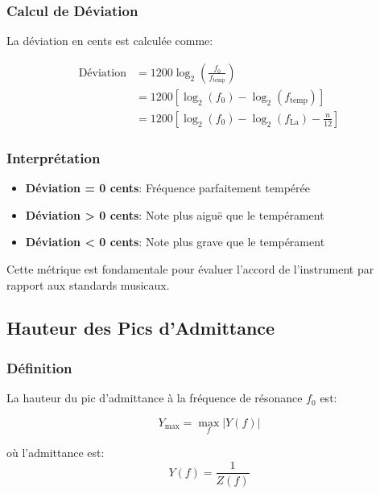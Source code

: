 \documentclass[12pt,a4paper,twocolumn]{article}
\newcommand{\impedance}{Z}
\newcommand{\admittance}{Y}
\newcommand{\freq}{f}
\newcommand{\freqzero}{f_0}
\begin{document}
\subsubsection{Calcul de Déviation}

La déviation en cents est calculée comme:

\begin{align}
\text{Déviation} &= 1200 \log_2\left(\frac{\freqzero}{\freq_{\text{temp}}}\right) \\
&= 1200 \left[\log_2(\freqzero) - \log_2(\freq_{\text{temp}})\right] \\
&= 1200 \left[\log_2(\freqzero) - \log_2(\freq_{\text{La}}) - \frac{n}{12}\right]
\label{eq:deviation_deriv}
\end{align}

\subsubsection{Interprétation}

\begin{itemize}
    \item \textbf{Déviation = 0 cents}: Fréquence parfaitement tempérée
    \item \textbf{Déviation > 0 cents}: Note plus aiguë que le tempérament
    \item \textbf{Déviation < 0 cents}: Note plus grave que le tempérament
\end{itemize}

Cette métrique est fondamentale pour évaluer l'accord de l'instrument par rapport aux standards musicaux.

\subsection{Hauteur des Pics d'Admittance}

\subsubsection{Définition}

La hauteur du pic d'admittance à la fréquence de résonance $\freqzero$ est:

\begin{equation}
\admittance_{\max} = \max_f |\admittance(f)|
\label{eq:admittance_peak}
\end{equation}

où l'admittance est:
\begin{equation}
\admittance(f) = \frac{1}{\impedance(f)}
\label{eq:admittance_def}
\end{equation}
\end{document}
